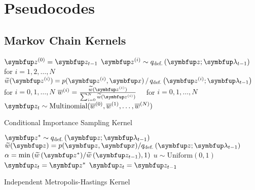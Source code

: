 
\section{Pseudocodes}\label{section:pseudocode}
\subsection{Markov Chain Kernels}


  \begin{center}
\begin{minipage}[c]{0.63\textwidth}
  \begin{algorithm2e}[H]
    \DontPrintSemicolon
    \SetAlgoLined
    \(\vz^{(0)} = \vz_{t-1}\) \;
    \(\vz^{(i)} \sim q_{\text{def.}}\left(\vz;\vlambda_{t-1}\right)\quad\) for \(i = 1, 2,\ldots, N\) \;
    \(\widetilde{w}(\vz^{(i)}) = p(\vz^{(i)},\vx) \,/\, q_{\text{def.}}\left(\vz^{(i)}; \vlambda_{t-1}\right)\quad\) for \(i = 0, 1,\ldots, N\)\;
    \(\overline{w}^{(i)} = \frac{\widetilde{w}(\vz^{(i)})}{ \sum^{N}_{i=0} \widetilde{w}(\vz^{(i)}) }\quad\) for \(i = 0, 1,\ldots, N\)\;
    \(\vz_{t} \sim \mathrm{Multinomial}(\overline{w}^{(0)}, \overline{w}^{(1)}, \ldots, \overline{w}^{(N)}) \)\;
    \caption{Conditional Importance Sampling Kernel}
  \end{algorithm2e}
\end{minipage}
  \end{center}

  \begin{center}
\begin{minipage}[c]{0.62\textwidth}
  \begin{algorithm2e}[H]
    \DontPrintSemicolon
    \SetAlgoLined
    \(\vz^* \sim q_{\text{def.}}\left(\vz; \vlambda_{t-1}\right)\)\;
    \(\widetilde{w}(\vz) = p(\vz,\vx)/q_{\text{def.}}\left(\vz; \vlambda_{t-1}\right) \)\;
    \(\alpha = \min\left( \widetilde{w}\,(\vz^*)/\widetilde{w}\,(\vz_{t-1}), 1\right)\)\;
    \(u \sim \mathrm{Uniform}(0, 1) \)\;
        {
          \(\vz_t = \vz^*\)
        }
        {
          \(\vz_t = \vz_{t-1}\)
        }
        \caption{Independent Metropolis-Hastings Kernel}
  \end{algorithm2e}
\end{minipage}
  \end{center}

